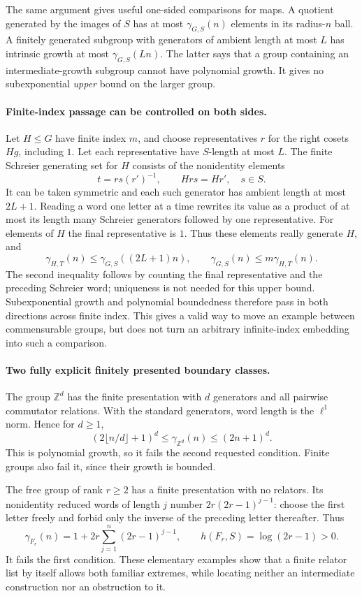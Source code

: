 \documentclass[11pt]{article}
\begin{document}
The same argument gives useful one-sided comparisons for maps.
A quotient generated by the images of $S$ has at most $\gamma_{G,S}(n)$
elements in its radius-$n$ ball. A finitely generated subgroup with
generators of ambient length at most $L$ has intrinsic growth at most
$\gamma_{G,S}(Ln)$. The latter says that a group containing an
intermediate-growth subgroup cannot have polynomial growth. It gives
no subexponential \emph{upper} bound on the larger group.

\paragraph{Finite-index passage can be controlled on both sides.}
Let $H\le G$ have finite index $m$, and choose representatives $r$
for the right cosets $Hg$, including $1$. Let each representative have
$S$-length at most $L$. The finite Schreier generating set for $H$
consists of the nonidentity elements
\[
 t=r s(r')^{-1},\qquad Hr s=Hr',\quad s\in S.
\]
It can be taken symmetric and each such generator has ambient length
at most $2L+1$. Reading a word one letter at a time rewrites its value
as a product of at most its length many Schreier generators followed
by one representative. For elements of $H$ the final representative
is $1$. Thus these elements really generate $H$, and
\[
 \gamma_{H,T}(n)\le\gamma_{G,S}((2L+1)n),\qquad
 \gamma_{G,S}(n)\le m\gamma_{H,T}(n).
 \tag{374.4}
\]
The second inequality follows by counting the final representative and
the preceding Schreier word; uniqueness is not needed for this upper
bound. Subexponential growth and polynomial boundedness therefore
pass in both directions across finite index. This gives a valid way
to move an example between commensurable groups, but does not turn an
arbitrary infinite-index embedding into such a comparison.

\paragraph{Two fully explicit finitely presented boundary classes.}
The group $\mathbb Z^d$ has the finite presentation with $d$ generators
and all pairwise commutator relations. With the standard generators,
word length is the $\ell^1$ norm. Hence for $d\ge1$,
\[
 (2\lfloor n/d\rfloor+1)^d
       \le\gamma_{\mathbb Z^d}(n)\le(2n+1)^d.
\]
This is polynomial growth, so it fails the second requested condition.
Finite groups also fail it, since their growth is bounded.

The free group of rank $r\ge2$ has a finite presentation with no
relators. Its nonidentity reduced words of length $j$ number
$2r(2r-1)^{j-1}$: choose the first letter freely and forbid only the
inverse of the preceding letter thereafter. Thus
\[
 \gamma_{F_r}(n)=1+2r\sum_{j=1}^n(2r-1)^{j-1},
 \qquad h(F_r,S)=\log(2r-1)>0.
\]
It fails the first condition. These elementary examples show that a
finite relator list by itself allows both familiar extremes, while
locating neither an intermediate construction nor an obstruction to it.
\end{document}
